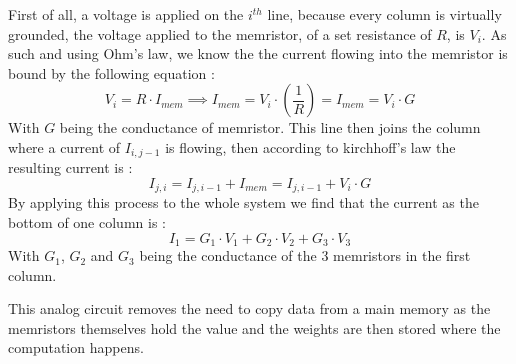 First of all, a voltage is applied on the $i^{th}$ line, because every column is virtually grounded, the voltage applied to the memristor, of a set resistance of $R$, is $V_i$. As such and using Ohm's law, we know the the current flowing into the memristor is bound by the following equation :
\begin{equation}
  V_i = R\cdot I_{mem} \implies I_{mem} = V_i\cdot (\frac{1}{R})=I_{mem} = V_i\cdot G
\end{equation}
With $G$ being the conductance of memristor.
This line then joins the column where a current of $I_{i,j-1}$ is flowing, then according to kirchhoff's law the resulting current is :
\begin{equation}
  I_{j,i} = I_{j,i-1}+I_{mem} = I_{j,i-1} + V_i\cdot G
\end{equation}
By applying this process to the whole system we find that the current as the bottom of one column is :
\begin{equation}
  I_1=G_1\cdot V_1 + G_2\cdot V_2 + G_3\cdot V_3
\end{equation}
With $G_1$, $G_2$ and $G_3$ being the conductance of the 3 memristors in the first column.

This analog circuit removes the need to copy data from a main memory as the memristors themselves hold the value and the weights are then stored where the computation happens.
